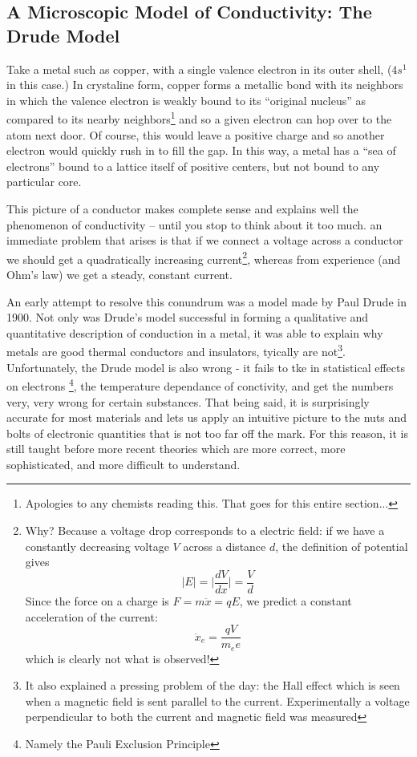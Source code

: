 \documentclass{tufte-book}
\begin{document}
\subsection{A Microscopic Model of Conductivity: The Drude Model}

Take a metal such as copper, with a single valence electron in its outer shell, ($4s^1$ in this case.) In crystaline form, copper forms a metallic bond with its neighbors in which the valence electron is weakly bound to its ``original nucleus'' as compared to its nearby neighbors\footnote{ Apologies to any chemists reading this. That goes for this entire section...} and so a given electron can hop over to the atom next door. Of course, this would leave a positive charge and so another electron would quickly rush in to fill the gap. In this way, a metal has a ``sea of electrons'' bound to a lattice itself of positive centers, but not bound to any particular core. 

This picture of a conductor makes complete sense and explains well the phenomenon of conductivity -- until you stop to think about it too much. an immediate problem that arises is that if we connect a voltage across a conductor we should get a quadratically increasing current\footnote{Why? Because a voltage drop corresponds to a electric field: if we have a constantly decreasing voltage $V$ across a distance $d$, the definition of potential gives 
$$\vert E \vert = \vert\frac{dV}{dx}\vert = \frac{V}{d}$$ 
Since the force on a charge is $F = m\ddot{x} = qE$, we predict a constant acceleration of the current:
$$
\ddot{x}_e = \frac{qV}{m_ee}
$$
which is clearly not what is observed!}, whereas from experience (and Ohm's law) we get a steady, constant current.

An early attempt to resolve this conundrum was a model made by Paul Drude in 1900. Not only was Drude's model successful in forming a qualitative and quantitative description of conduction in a metal, it was able to explain why metals are good thermal conductors and insulators, tyically are not\footnote{It also explained a pressing problem of the day: the Hall effect which is seen when a magnetic field is sent parallel to the current. Experimentally a voltage perpendicular to both the current and magnetic field was measured}. Unfortunately, the Drude model is also wrong - it fails to tke in statistical effects on electrons \footnote{Namely the Pauli Exclusion Principle}, the temperature dependance of conctivity, and get the numbers very, very wrong for certain substances. That being said, it is surprisingly accurate for most materials and lets us apply an intuitive picture to the nuts and bolts of electronic quantities that is not too far off the mark. For this reason, it is still taught before more recent theories which are more correct, more sophisticated, and more difficult to understand. 
\end{document}
